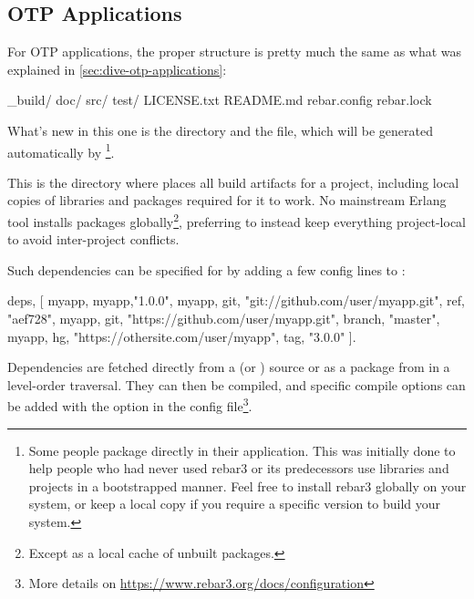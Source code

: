 \subsection{OTP Applications}
\label{subsec:building-otp-applications}

For OTP applications, the proper structure is pretty much the same as what was explained in \ref{sec:dive-otp-applications}:

\begin{VerbatimText}
_build/
doc/
src/
test/
LICENSE.txt
README.md
rebar.config
rebar.lock
\end{VerbatimText}

What's new in this one is the  directory and the  file, which will be generated automatically by \footnote{Some people package  directly in their application. This was initially done to help people who had never used rebar3 or its predecessors use libraries and projects in a bootstrapped manner. Feel free to install rebar3 globally on your system, or keep a local copy if you require a specific version to build your system.}. 

This is the directory where  places all build artifacts for a project, including local copies of libraries and packages required for it to work. No mainstream Erlang tool installs packages globally\footnote{Except as a local cache of unbuilt packages.}, preferring to instead keep everything project-local to avoid inter-project conflicts.

Such dependencies can be specified for  by adding a few config lines to :

\begin{VerbatimText}
{deps, [
  myapp,
  {myapp,"1.0.0"},
  {myapp, {git, "git://github.com/user/myapp.git", {ref, "aef728"}}},
  {myapp, {git, "https://github.com/user/myapp.git", {branch, "master"}}},
  {myapp, {hg, "https://othersite.com/user/myapp", {tag, "3.0.0"}}}
 ]}.
\end{VerbatimText}

Dependencies are fetched directly from a  (or ) source or as a package from \href{https://hex.pm}{} in a level-order traversal. They can then be compiled, and specific compile options can be added with the  option in the config file\footnote{More details on \href{https://www.rebar3.org/docs/configuration}{https://www.rebar3.org/docs/configuration}}. 


